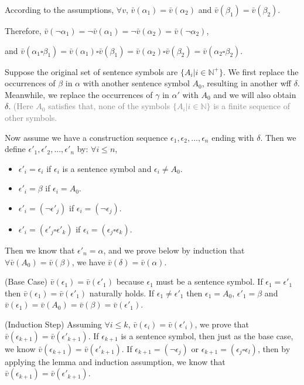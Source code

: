 \documentclass{article}
\begin{document}
\Proof According to the assumptions, $\forall v$, $\bar{v}(\alpha_1)=\bar{v}(\alpha_2)$ and $\bar{v}(\beta_1)=\bar{v}(\beta_2)$.

Therefore, $\bar{v}(\neg\alpha_1)=\neg \bar{v}(\alpha_1)=\neg \bar{v}(\alpha_2)=\bar{v}(\neg\alpha_2)$,

and $\bar{v}(\alpha_1 \square \beta_1)=\bar{v}(\alpha_1) \square \bar{v}(\beta_1) = \bar{v}(\alpha_2) \square \bar{v}(\beta_2) = \bar{v}(\alpha_2 \square \beta_2)$.

\QED

Suppose the original set of sentence symbols are $\{A_i|i\in\mathbb{N}^{+}\}$. We first replace the occurrences of $\beta$ in $\alpha$ with another sentence symbol $A_0$, resulting in another wff $\delta$. Meanwhile, we replace the occurrences of $\gamma$ in $\alpha'$ with $A_0$ and we will also obtain $\delta$. \textcolor{gray}{(Here $A_0$ satisfies that, none of the symbols $\{A_i|i\in\mathbb{N}\}$ is a finite sequence of other symbols.}

Now assume we have a construction sequence $\epsilon_1, \epsilon_2, ..., \epsilon_n$ ending with $\delta$. Then we define $\epsilon'_1, \epsilon'_2, ..., \epsilon'_n$ by: $\forall i \le n$,
\begin{itemize}
	\item $\epsilon'_i = \epsilon_i$ if $\epsilon_i$ is a sentence symbol and $\epsilon_i \ne A_0$.
	\item $\epsilon'_i = \beta$ if $\epsilon_i = A_0$.
	\item $\epsilon'_i = (\neg \epsilon'_j)$ if $\epsilon_i = (\neg \epsilon_j)$.
	\item $\epsilon'_i = (\epsilon'_j \square \epsilon'_k)$ if $\epsilon_i = (\epsilon_j \square \epsilon_k)$.
\end{itemize}

Then we know that $\epsilon'_n = \alpha$, and we prove below by induction that $\forall \bar{v}(A_0)=\bar{v}(\beta)$, we have $\bar{v}(\delta)=\bar{v}(\alpha)$.

(Base Case) $\bar{v}(\epsilon_1) = \bar{v}(\epsilon'_1)$ because $\epsilon_1$ must be a sentence symbol. If $\epsilon_1 = \epsilon'_1$ then $\bar{v}(\epsilon_1)=\bar{v}(\epsilon'_1)$ naturally holds. If $\epsilon_1 \ne \epsilon'_1$ then $\epsilon_1 = A_0$, $\epsilon'_1=\beta$ and $\bar{v}(\epsilon_1) = \bar{v}(A_0)=\bar{v}(\beta) = \bar{v}(\epsilon'_1)$.

(Induction Step) Assuming $\forall i \le k$, $\bar{v}(\epsilon_i)=\bar{v}(\epsilon'_i)$, we prove that $\bar{v}(\epsilon_{k+1})=\bar{v}(\epsilon'_{k+1})$. If $\epsilon_{k+1}$ is a sentence symbol, then just as the base case, we know $\bar{v}(\epsilon_{k+1})=\bar{v}(\epsilon'_{k+1})$. If $\epsilon_{k+1}=(\neg \epsilon_j)$ or $\epsilon_{k+1} = (\epsilon_j \square \epsilon_l)$, then by applying the lemma and induction assumption, we know that $\bar{v}(\epsilon_{k+1})=\bar{v}(\epsilon'_{k+1})$.
\end{document}
